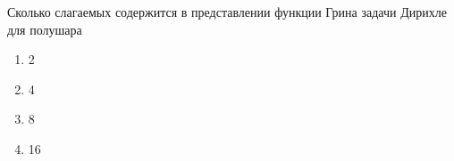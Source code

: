 Сколько слагаемых содержится в представлении функции Грина задачи Дирихле для полушара

\begin{enumerate}[label=\arabic*)]
    \item 2
    \item 4
    \item 8
    \item 16
\end{enumerate}

